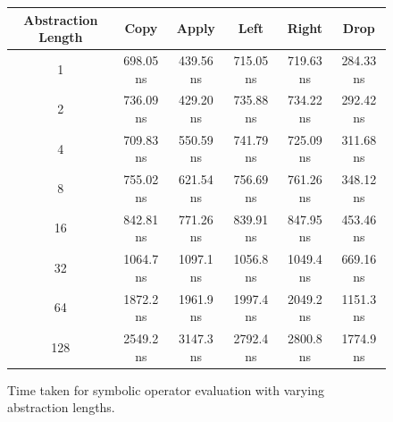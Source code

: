 \begin{figure}[H]
    \begin{center}
    \begin{tabular}{ |c|c|c|c|c|c| } 
    \hline
    Abstraction Length & Copy & Apply & Left & Right & Drop \\
    \hline
    1 & 698.05 ns & 439.56 ns & 715.05 ns & 719.63 ns & 284.33 ns \\
    \hline
    2 & 736.09 ns & 429.20 ns & 735.88 ns & 734.22 ns & 292.42 ns \\
    \hline
    4 & 709.83 ns & 550.59 ns & 741.79 ns & 725.09 ns & 311.68 ns \\
    \hline
    8 & 755.02 ns & 621.54 ns & 756.69 ns & 761.26 ns & 348.12 ns \\
    \hline
    16 & 842.81 ns & 771.26 ns & 839.91 ns & 847.95 ns & 453.46 ns \\
    \hline
    32 & 1064.7 ns & 1097.1 ns & 1056.8 ns & 1049.4 ns & 669.16 ns \\
    \hline
    64 & 1872.2 ns & 1961.9 ns & 1997.4 ns & 2049.2 ns & 1151.3 ns \\
    \hline
    128 & 2549.2 ns & 3147.3 ns & 2792.4 ns & 2800.8 ns & 1774.9 ns \\
    \hline
    \end{tabular}
    \end{center}
    \caption{Time taken for symbolic operator evaluation with varying abstraction lengths.}
    \label{fig:basic_operator_results}
\end{figure}

